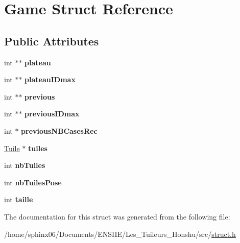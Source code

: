 \hypertarget{structGame}{}\section{Game Struct Reference}
\label{structGame}
\subsection*{Public Attributes}
\begin{DoxyCompactItemize}
\item 
\mbox{\label{structGame_a1decb21080af192386c0a7177a41f277}} 
int $\ast$$\ast$ {\bfseries plateau}
\item 
\mbox{\label{structGame_a15c1262a40ba6f6a06e1d35ebd61db2b}} 
int $\ast$$\ast$ {\bfseries plateau\+I\+Dmax}
\item 
\mbox{\label{structGame_ad3dc463dc77c80d5d53c9c80bff48292}} 
int $\ast$$\ast$ {\bfseries previous}
\item 
\mbox{\label{structGame_adb28526333f9c381cb9c8aace30847ae}} 
int $\ast$$\ast$ {\bfseries previous\+I\+Dmax}
\item 
\mbox{\label{structGame_a38e52524b051d8386c4a38d8d367079f}} 
int $\ast$ {\bfseries previous\+N\+B\+Cases\+Rec}
\item 
\mbox{\label{structGame_ac3fb01df4e1e340920e8b97b34d0db0b}} 
\hyperlink{structTuile}{Tuile} $\ast$ {\bfseries tuiles}
\item 
\mbox{\label{structGame_a119de7a9121b7142cd5db52803ae3977}} 
int {\bfseries nb\+Tuiles}
\item 
\mbox{\label{structGame_aec5485e406ead32a4fa474f7ca6f3b1d}} 
int {\bfseries nb\+Tuiles\+Pose}
\item 
\mbox{\label{structGame_ada885d65654c46afafd089933d842b97}} 
int {\bfseries taille}
\end{DoxyCompactItemize}


The documentation for this struct was generated from the following file\+:\begin{DoxyCompactItemize}
\item 
/home/sphinx06/\+Documents/\+E\+N\+S\+I\+I\+E/\+Les\+\_\+\+Tuileurs\+\_\+\+Honshu/src/\hyperlink{struct_8h}{struct.\+h}\end{DoxyCompactItemize}
